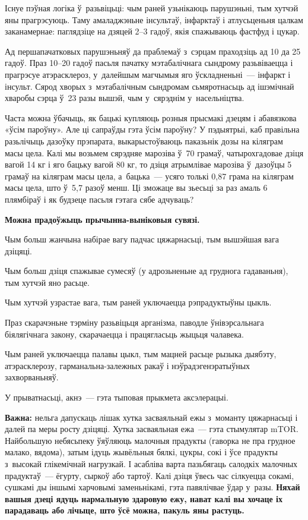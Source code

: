 Існуе пэўная логіка ў~разьвіцьці: чым раней узьнікаюць парушэньні, тым хутчэй яны прагрэсуюць. Таму амаладжэньне інсультаў, інфарктаў і атлусьценьня цалкам заканамернае: паглядзіце на дзяцей 2--3 гадоў, якія спажываюць фастфуд і цукар. 

Ад першапачатковых парушэньняў да праблемаў з~сэрцам праходзіць ад 10 да 25 гадоў. Праз 10--20 гадоў пасьля пачатку мэтабалічнага сындрому разьвіваецца і прагрэсуе атэрасклероз, у~далейшым магчымыя яго ўскладненьні~--- інфаркт і інсульт. Сярод хворых з~мэтабалічным сындромам сьмяротнасьць ад ішэмічнай хваробы сэрца ў~23 разы вышэй, чым у~сярэднім у~насельніцтва.

Часта можна ўбачыць, як бацькі купляюць розныя прысмакі дзецям і абавязкова «ўсім пароўну». Але ці сапраўды гэта ўсім пароўну? У пэдыятрыі, каб правільна разьлічыць дазоўку прэпарата, выкарыстоўваюць паказьнік дозы на кіляграм масы цела. Калі мы возьмем сярэдняе марозіва ў~70 грамаў, чатырохгадовае дзіця вагой 14 кг і яго бацьку вагой 80 кг, то дзіця атрымлівае марозіва ў~дазоўцы 5 грамаў на кіляграм масы цела, а~бацька~--- усяго толькі 0,87 грама на кіляграм масы цела, што ў~5,7 разоў менш. Ці зможаце вы зьесьці за раз амаль 6 плямбіраў і як будзеце пасьля гэтага сябе адчуваць? 


\textbf{Можна прадоўжыць прычынна-выніковыя сувязі.}

Чым больш жанчына набірае вагу падчас цяжарнасьці, тым вышэйшая вага дзіцяці. 

Чым больш дзіця спажывае сумесяў (у адрозьненьне ад груднога гадаваньня), тым хутчэй яно расьце. 

Чым хутчэй узрастае вага, тым раней уключаецца рэпрадуктыўны цыкль. 

Праз скарачэньне тэрміну разьвіцьця арганізма, паводле ўнівэрсальнага біялягічнага закону, скарачаецца і працягласьць жыцьця чалавека.

Чым раней уключаецца палавы цыкл, тым мацней расьце рызыка дыябэту, атэрасклерозу, гарманальна-залежных ракаў і нэўрадэгенэратыўных захворваньняў.

У прыватнасьці, акнэ~--- гэта тыповая прыкмета аксэлерацыі.

\textbf{Важна:} нельга дапускаць лішак хутка засваяльнай ежы з~моманту цяжарнасьці і далей па меры росту дзіцяці. Хутка засваяльная ежа~--- гэта стымулятар mTOR. Найбольшую небясьпеку ўяўляюць малочныя прадукты (гаворка не пра грудное малако, вядома), затым ідуць жывёльныя бялкі, цукры, сокі і ўсе прадукты з~высокай глікемічнай нагрузкай. І асабліва варта пазьбягаць салодкіх малочных прадуктаў~--- ёгурту, сыркоў або тартоў. Калі дзіця ўвесь час сілкуецца сокамі, сушкамі ды іншымі харчовымі заменьнікамі, гэта павялічвае ўдар у~разы. \textbf{Няхай вашыя дзеці ядуць нармальную здаровую ежу, нават калі вы хочаце іх парадаваць або лічыце, што ўсё можна, пакуль яны растуць.}

